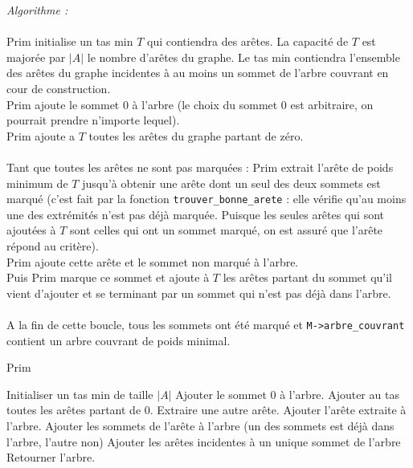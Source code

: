\documentclass[a4paper,11pt]{article}
\begin{document}
\textit{Algorithme : } \\
\\
Prim initialise un tas min $T$ qui contiendra des arêtes. La capacité de $T$ est majorée par $|A|$ le nombre d'arêtes du graphe. Le tas min contiendra l'ensemble des arêtes du graphe incidentes à au moins un sommet de l'arbre couvrant en cour de construction.\\
Prim ajoute le sommet 0 à l'arbre (le choix du sommet 0 est arbitraire, on pourrait prendre n'importe lequel).\\
Prim ajoute a $T$ toutes les arêtes du graphe partant de zéro.\\
\\
Tant que toutes les arêtes ne sont pas marquées :
Prim extrait l'arête de poids minimum de $T$ jusqu'à obtenir une arête dont un seul des deux sommets est marqué (c'est fait par la fonction \texttt{trouver\_bonne\_arete} : elle vérifie qu'au moins une des extrémités n'est pas déjà marquée. Puisque les seules arêtes qui sont ajoutées à $T$ sont celles qui ont un sommet marqué, on est assuré que l'arête répond au critère).\\
Prim ajoute cette arête et le sommet non marqué à l'arbre.\\
Puis Prim marque ce sommet et ajoute à $T$ les arêtes partant du sommet qu'il vient d'ajouter et se terminant par un sommet qui n'est pas déjà dans l'arbre.\\
\\
A la fin de cette boucle, tous les sommets ont été marqué et \texttt{M->arbre\_couvrant} contient un arbre couvrant de poids minimal.\\

\begin{algorithm}
\caption{Prim}
\begin{algorithmic}[1]

\STATE Initialiser un tas min de taille $|A|$
\STATE Ajouter le sommet 0 à l'arbre.
\STATE Ajouter au tas toutes les arêtes partant de 0.
\STATE Extraire une autre arête.
\ENDWHILE
\STATE Ajouter l'arête extraite à l'arbre.
\STATE Ajouter les sommets de l'arête à l'arbre (un des sommets est déjà dans l'arbre, l'autre non)
\STATE Ajouter les arêtes incidentes à un unique sommet de l'arbre
\ENDWHILE
\STATE Retourner l'arbre.

\end{algorithmic}
\end{algorithm}
\end{document}
